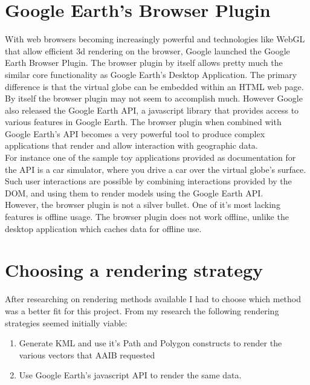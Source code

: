 \section{Google Earth's Browser Plugin}

With web browsers becoming increasingly powerful and technologies like WebGL that allow efficient 3d rendering on the browser, Google launched the Google Earth Browser Plugin. The browser plugin by itself allows pretty much the similar core functionality as Google Earth's Desktop Application. The primary difference is that the virtual globe can be embedded within an HTML web page.\\

By itself the browser plugin may not seem to accomplish much. However Google also released the Google Earth
API, a javascript library that provides access to various features in Google Earth. The browser plugin when combined with Google Earth's API becomes a very powerful tool to produce complex applications that render and allow interaction with geographic data. \\

For instance one of the sample toy applications provided as documentation for the API is a car simulator,
where you drive a car over the virtual globe's surface. \\

Such user interactions are possible by combining interactions provided by the DOM, and using them to render models using the Google Earth API. \\

However, the browser plugin is not a silver bullet. One of it's most lacking features is offline usage. The browser plugin does not work offline, unlike the desktop application which caches data for offline use.


\section{Choosing a rendering strategy}

After researching on rendering methods available I had to choose which method was a better fit for this project. From my research the following rendering strategies seemed initially viable:

\begin{enumerate}
\item Generate KML and use it's Path and Polygon constructs to render the various vectors that AAIB requested
\item Use Google Earth's javascript API to render the same data.
\end{enumerate}

